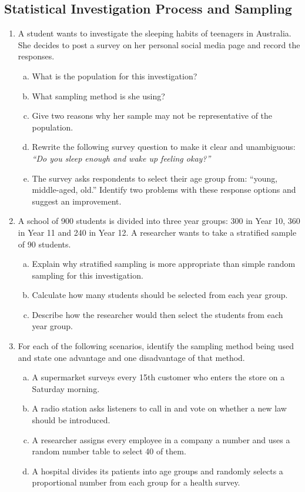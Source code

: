 \documentclass{article}
\begin{document}
\subsection{Statistical Investigation Process and Sampling}
\begin{enumerate}

  \item A student wants to investigate the sleeping habits of teenagers in Australia. She
  decides to post a survey on her personal social media page and record the responses.
  \begin{enumerate}[(a)]
    \item What is the population for this investigation?
    \item What sampling method is she using?
    \item Give two reasons why her sample may not be representative of the population.
    \item Rewrite the following survey question to make it clear and unambiguous:\\
    \textit{``Do you sleep enough and wake up feeling okay?''}
    \item The survey asks respondents to select their age group from: ``young, middle-aged,
    old.'' Identify two problems with these response options and suggest an improvement.
  \end{enumerate}

  \item A school of 900 students is divided into three year groups: 300 in Year 10, 360 in
  Year 11 and 240 in Year 12. A researcher wants to take a stratified sample of 90 students.
  \begin{enumerate}[(a)]
    \item Explain why stratified sampling is more appropriate than simple random sampling for
    this investigation.
    \item Calculate how many students should be selected from each year group.
    \item Describe how the researcher would then select the students from each year group.
  \end{enumerate}

  \item For each of the following scenarios, identify the sampling method being used and
  state one advantage and one disadvantage of that method.
  \begin{enumerate}[(a)]
    \item A supermarket surveys every 15th customer who enters the store on a Saturday morning.
    \item A radio station asks listeners to call in and vote on whether a new law should be
    introduced.
    \item A researcher assigns every employee in a company a number and uses a random number
    table to select 40 of them.
    \item A hospital divides its patients into age groups and randomly selects a proportional
    number from each group for a health survey.
  \end{enumerate}


\end{enumerate}
\end{document}
